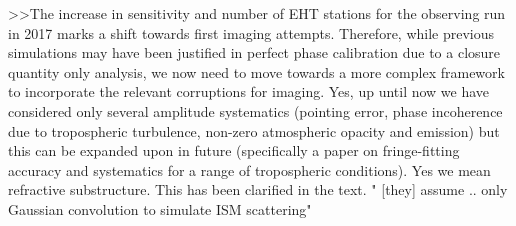 >>The increase in sensitivity and number of EHT stations for the observing run in 2017 marks a shift towards first imaging attempts. Therefore, while previous simulations may have been justified in perfect phase calibration due to a closure quantity only analysis, we now need to move towards a more complex framework to incorporate the relevant corruptions for imaging. Yes, up until now we have considered only several amplitude systematics (pointing error, phase incoherence due to tropospheric turbulence, non-zero atmospheric opacity and emission) but this can be expanded upon in future (specifically a paper on fringe-fitting accuracy and systematics for a range of tropospheric conditions).
Yes we mean refractive substructure. This has been clarified in the text. " [they] assume .. only Gaussian convolution to simulate ISM scattering" 